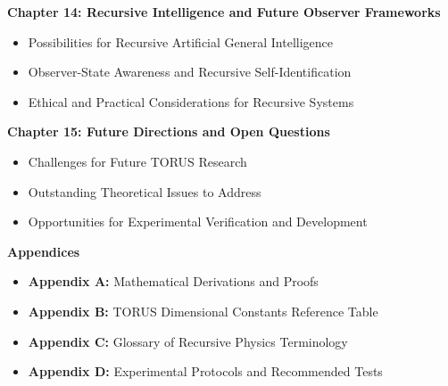\documentclass[
]{article}
\begin{document}
\textbf{Chapter 14: Recursive Intelligence and Future Observer
Frameworks}

\begin{itemize}
\item
  Possibilities for Recursive Artificial General Intelligence
\item
  Observer-State Awareness and Recursive Self-Identification
\item
  Ethical and Practical Considerations for Recursive Systems
\end{itemize}

\textbf{Chapter 15: Future Directions and Open Questions}

\begin{itemize}
\item
  Challenges for Future TORUS Research
\item
  Outstanding Theoretical Issues to Address
\item
  Opportunities for Experimental Verification and Development
\end{itemize}

\textbf{Appendices}

\begin{itemize}
\item
  \textbf{Appendix A:} Mathematical Derivations and Proofs
\item
  \textbf{Appendix B:} TORUS Dimensional Constants Reference Table
\item
  \textbf{Appendix C:} Glossary of Recursive Physics Terminology
\item
  \textbf{Appendix D:} Experimental Protocols and Recommended Tests
\end{itemize}
\end{document}

